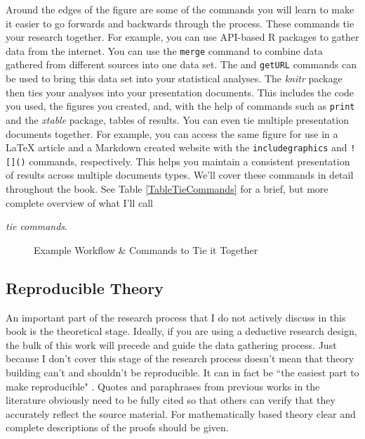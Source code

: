 Around the edges of the figure are some of the commands you will learn to make it easier to go forwards and backwards through the process. These commands tie your research together. For example, you can use API-based R packages to gather data from the internet. You can use the \texttt{merge} command to combine data gathered from different sources into one data set. The  and \texttt{getURL} commands can be used to bring this data set into your statistical analyses. The {\emph{knitr}} package then ties your analyses into your presentation documents. This includes the code you used, the figures you created, and, with the help of commands such as \texttt{print} and the {\emph{xtable}} package, tables of results. You can even tie multiple presentation documents together. For example, you can access the same figure for use in a LaTeX article and a Markdown created website with the \texttt{includegraphics} and \texttt{![]()}\index{![]()} commands, respectively. This helps you maintain a consistent presentation of results across multiple documents types. We'll cover these commands in detail throughout the book. See Table \ref{TableTieCommands} for a brief, but more complete overview of what I'll call {\emph{tie commands}. 

\clearpage
\thispagestyle{plain}
\begin{landscape}
\begin{figure}[th!]
    \caption{Example Workflow \& Commands to Tie it Together}
    \label{WorkflowTies}
    \begin{center}
    
    
    \end{center}
\end{figure}
\end{landscape}

\subsection{Reproducible Theory}

An important part of the research process that I do not actively discuss in this book is the theoretical stage. Ideally, if you are using a deductive research design, the bulk of this work will precede and guide the data gathering process. Just because I don't cover this stage of the research process doesn't mean that theory building can't and shouldn't be reproducible. It can in fact be ``the easiest part to make reproducible" \cite[1254]{Vandewalle2007}. Quotes and paraphrases from previous works in the literature obviously need to be fully cited so that others can verify that they accurately reflect the source material. For mathematically based theory clear and complete descriptions of the proofs should be given. 

}
